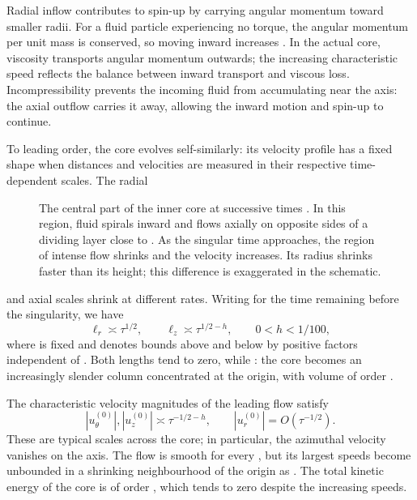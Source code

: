 Radial inflow contributes to spin-up by carrying angular momentum toward smaller radii.
For a fluid particle experiencing no torque, the angular momentum per unit mass
 is conserved, so moving inward increases . In the actual core, viscosity transports angular
momentum outwards; the increasing characteristic speed reflects the balance between inward
transport and viscous loss. Incompressibility prevents the incoming fluid from accumulating
near the axis: the axial outflow carries it away, allowing the inward motion and spin-up to
continue.

To leading order, the core evolves self-similarly: its velocity profile has a fixed shape when
distances and velocities are measured in their respective time-dependent scales. The radial
%
\begin{figure}[t]
  \centering
  \caption{The central part of the inner core at successive times
  . In this region, fluid spirals inward and flows axially on opposite sides of a
  dividing layer close to . As the singular time approaches, the region of
  intense flow shrinks and the velocity increases. Its radius shrinks faster than
  its height; this difference is exaggerated in the schematic.}\label{fig:1}
\end{figure}%
and axial scales shrink at different rates. Writing  for the time remaining before the
singularity, we have
\begin{equation*}
  \ell_r\asymp\tau^{1/2},
  \qquad \ell_z\asymp\tau^{1/2-h},
  \qquad 0<h<1/100,
\end{equation*}
where  is fixed and  denotes bounds above and below by positive factors independent
of . Both lengths tend to zero, while
: the core becomes an increasingly
slender column concentrated at the origin, with volume of order
.

The characteristic velocity magnitudes of the leading flow satisfy
\begin{equation*}
  |u_\theta^{(0)}|,|u_z^{(0)}|\asymp\tau^{-1/2-h},
  \qquad |u_r^{(0)}|=O(\tau^{-1/2}).
\end{equation*}
These are typical scales across the core; in particular, the azimuthal velocity vanishes on
the axis. The flow is smooth for every , but its largest speeds become unbounded in
a shrinking neighbourhood of the origin as . The total kinetic energy of the core is of
order , which tends to zero despite the increasing speeds.

